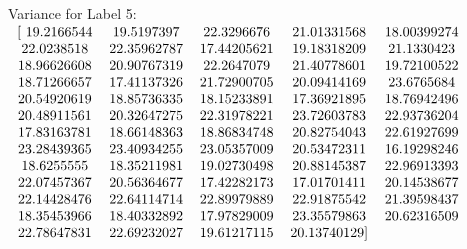 \documentclass[a4paper]{article}
\begin{document}
Variance for Label 5: 
$\begin{tabular}{  c c c c c  }
    [ 19.2166544  & 19.5197397  & 22.3296676  & 21.01331568 & 18.00399274 \\
      22.0238518  & 22.35962787 & 17.44205621 & 19.18318209 & 21.1330423 \\
      18.96626608 & 20.90767319 & 22.2647079  & 21.40778601 & 19.72100522 \\
      18.71266657 & 17.41137326 & 21.72900705 & 20.09414169 & 23.6765684 \\
      20.54920619 & 18.85736335 & 18.15233891 & 17.36921895 & 18.76942496 \\
      20.48911561 & 20.32647275 & 22.31978221 & 23.72603783 & 22.93736204 \\
      17.83163781 & 18.66148363 & 18.86834748 & 20.82754043 & 22.61927699 \\
      23.28439365 & 23.40934255 & 23.05357009 & 20.53472311 & 16.19298246 \\
      18.6255555  & 18.35211981 & 19.02730498 & 20.88145387 & 22.96913393 \\
      22.07457367 & 20.56364677 & 17.42282173 & 17.01701411 & 20.14538677 \\
      22.14428476 & 22.64114714 & 22.89979889 & 22.91875542 & 21.39598437 \\
      18.35453966 & 18.40332892 & 17.97829009 & 23.35579863 & 20.62316509 \\
      22.78647831 & 22.69232027 & 19.61217115 & 20.13740129] & \\
\end{tabular}$

\vspace{3mm}
\end{document}

